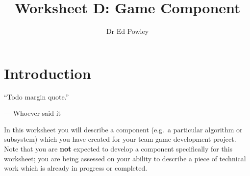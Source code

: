 \documentclass{../../fal_assignment}
\title{Worksheet D: Game Component}
\author{Dr Ed Powley}
\begin{document}
\maketitle

\section*{Introduction}

\begin{marginquote}
``Todo margin quote.''

--- Whoever said it
\end{marginquote}

In this worksheet you will describe a component (e.g.\ a particular algorithm or subsystem)
which you have created for your team game development project.
Note that you are \textbf{not} expected to develop a component specifically for this worksheet;
you are being assessed on your ability to describe a piece of technical work which is already
in progress or completed.
\end{document}
